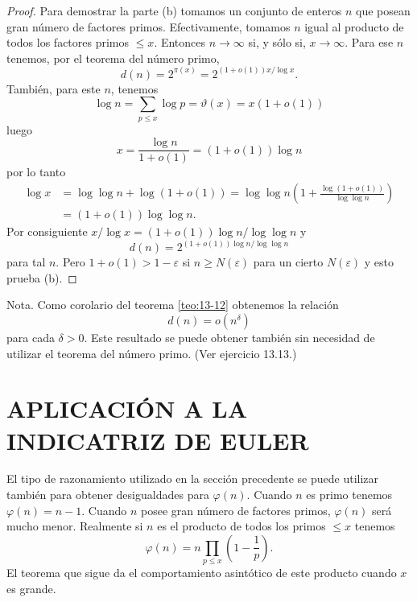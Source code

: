 \begin{proof}
        Para demostrar la parte (b) tomamos un conjunto de enteros $n$ que posean gran número de
        factores primos. Efectivamente, tomamos $n$ igual al producto de todos los factores
        primos $\leq x$. Entonces $n\to\infty$ si, y sólo si, $x\to\infty$. Para ese $n$ tenemos,
        por el teorema del número primo,
        \begin{equation*}
            d(n)=2^{\pi(x)}=2^{(1+o(1))x/\log x}.
        \end{equation*}
        También, para este $n$, tenemos
        \begin{equation*}
            \log n=\sum_{p\leq x}\log p=\vartheta(x)=x(1+o(1))
        \end{equation*}
        luego
        \begin{equation*}
            x=\frac{\log n}{1+o(1)}=(1+o(1))\log n
        \end{equation*}
        por lo tanto
        \begin{align*}
            \log x&=\log\log n+\log(1+o(1))=\log\log n\left(1+\frac{\log(1+o(1))}{\log\log n}\right)\\
            &=(1+o(1))\log\log n.
        \end{align*}
        Por consiguiente $x/\log x=(1+o(1))\log n/\log\log n$ y
        \begin{equation*}
            d(n)=2^{(1+o(1))\log n/\log\log n}
        \end{equation*}
        para tal $n$. Pero $1+o(1)>1-\varepsilon$ si $n\geq N(\varepsilon)$ para un cierto
        $N(\varepsilon)$ y esto prueba (b).
    \end{proof}

    Nota. Como corolario del teorema \ref{teo:13-12} obtenemos la relación
    \begin{equation}\label{eq:13-31}
        d(n)=o(n^{\delta})
    \end{equation}
    para cada $\delta>0$. Este resultado se puede obtener también sin necesidad de utilizar el
    teorema del número primo. (Ver ejercicio 13.13.)

    \section{APLICACIÓN A LA INDICATRIZ DE EULER}

    El tipo de razonamiento utilizado en la sección precedente se puede utilizar también para
    obtener desigualdades para $\varphi(n)$. Cuando $n$ es primo tenemos $\varphi(n)=n-1$.
    Cuando $n$ posee gran número de factores primos, $\varphi(n)$ será mucho menor. Realmente si
    $n$ es el producto de todos los primos $\leq x$ tenemos
    \begin{equation*}
        \varphi(n)=n\prod_{p\leq x}\left(1-\frac{1}{p}\right).
    \end{equation*}
    El teorema que sigue da el comportamiento asintótico de este producto cuando $x$ es grande.

